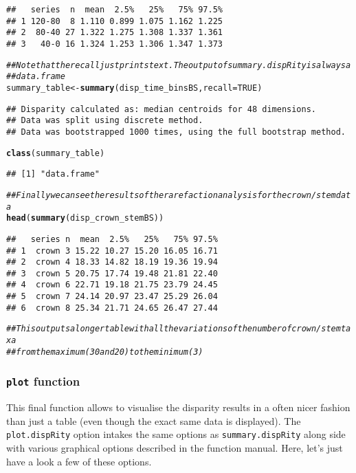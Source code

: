 \documentclass{article}\usepackage[]{graphicx}\usepackage[]{color}
\makeatletter
\newcommand{\hlnum}[1]{\textcolor[rgb]{0.686,0.059,0.569}{#1}}%
\newcommand{\hlcom}[1]{\textcolor[rgb]{0.678,0.584,0.686}{\textit{#1}}}%
\newcommand{\hlstd}[1]{\textcolor[rgb]{0.345,0.345,0.345}{#1}}%
\newcommand{\hlkwb}[1]{\textcolor[rgb]{0.69,0.353,0.396}{#1}}%
\newcommand{\hlkwc}[1]{\textcolor[rgb]{0.333,0.667,0.333}{#1}}%
\newcommand{\hlkwd}[1]{\textcolor[rgb]{0.737,0.353,0.396}{\textbf{#1}}}%
\newenvironment{kframe}{%
 \def\at@end@of@kframe{}%
 \ifinner\ifhmode%
  \def\at@end@of@kframe{\end{minipage}}%
  \begin{minipage}{\columnwidth}%
 \fi\fi%
 \def\FrameCommand##1{\hskip\@totalleftmargin \hskip-\fboxsep
 \colorbox{shadecolor}{##1}\hskip-\fboxsep
     \hskip-\linewidth \hskip-\@totalleftmargin \hskip\columnwidth}%
 \MakeFramed {\advance\hsize-\width
   \@totalleftmargin\z@ \linewidth\hsize
   \@setminipage}}%
 {\par\unskip\endMakeFramed%
 \at@end@of@kframe}
\newenvironment{knitrout}{}{} %
\makeatother
\begin{document}
\begin{knitrout}
\begin{kframe}
\begin{verbatim}
##   series  n  mean  2.5%   25%   75% 97.5%
## 1 120-80  8 1.110 0.899 1.075 1.162 1.225
## 2  80-40 27 1.322 1.275 1.308 1.337 1.361
## 3   40-0 16 1.324 1.253 1.306 1.347 1.373
\end{verbatim}
\begin{alltt}
\hlcom{## Note that the recall just prints text. The output of summary.dispRity is always a}
\hlcom{## data.frame}
\hlstd{summary_table} \hlkwb{<-} \hlkwd{summary}\hlstd{(disp_time_binsBS,} \hlkwc{recall} \hlstd{=} \hlnum{TRUE}\hlstd{)}
\end{alltt}
\begin{verbatim}
## Disparity calculated as: median centroids for 48 dimensions.
## Data was split using discrete method.
## Data was bootstrapped 1000 times, using the full bootstrap method.
\end{verbatim}
\begin{alltt}
\hlkwd{class}\hlstd{(summary_table)}
\end{alltt}
\begin{verbatim}
## [1] "data.frame"
\end{verbatim}
\begin{alltt}
\hlcom{## Finally we can see the results of the rarefaction analysis for the crown/stem data}
\hlkwd{head}\hlstd{(}\hlkwd{summary}\hlstd{(disp_crown_stemBS))}
\end{alltt}
\begin{verbatim}
##   series n  mean  2.5%   25%   75% 97.5%
## 1  crown 3 15.22 10.27 15.20 16.05 16.71
## 2  crown 4 18.33 14.82 18.19 19.36 19.94
## 3  crown 5 20.75 17.74 19.48 21.81 22.40
## 4  crown 6 22.71 19.18 21.75 23.79 24.45
## 5  crown 7 24.14 20.97 23.47 25.29 26.04
## 6  crown 8 25.34 21.71 24.65 26.47 27.44
\end{verbatim}
\begin{alltt}
\hlcom{## This outputs a longer table with all the variations of the number of crown/stem taxa}
\hlcom{## from the maximum (30 and 20) to the minimum (3)}
\end{alltt}
\end{kframe}
\end{knitrout}

\subsubsection{\texttt{plot} function}
This final function allows to visualise the disparity results in a often nicer fashion than just a table (even though the exact same data is displayed).
The \texttt{plot.dispRity} option intakes the same options as \texttt{summary.dispRity} along side with various graphical options described in the function manual.
Here, let's just have a look a few of these options.
\end{document}
